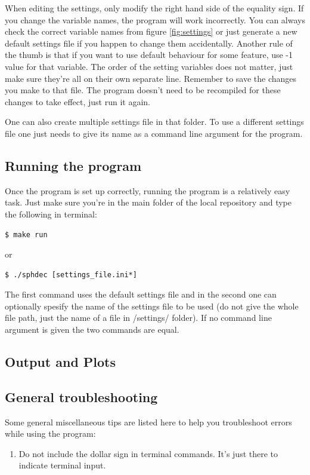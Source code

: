 \documentclass[english,12pt,a4paper,pdftex,sci,utf8]{aaltothesis}
\begin{document}
When editing the settings, only modify the right hand side of the equality sign. If you change the variable names, the program will work incorrectly. You can always check the correct variable names from figure \ref{fig:settings} or just generate a new default settings file if you happen to change them accidentally. Another rule of the thumb is that if you want to use default behaviour for some feature, use -1 value for that variable. The order of the setting variables does not matter, just make sure they're all on their own separate line. Remember to save the changes you make to that file. The program doesn't need to be recompiled for these changes to take effect, just run it again. 
\par One can also create multiple settings file in that folder. To use a different settings file one just needs to give its name as a command line argument for the program.

\subsection{Running the program}

Once the program is set up correctly, running the program is a relatively easy task. Just make sure you're in the main folder of the local repository and type the following in terminal:
\begin{verbatim}
$ make run
\end{verbatim}
or
\begin{verbatim}
$ ./sphdec [settings_file.ini*]
\end{verbatim}

\noindent The first command uses the default settings file and in the second one can optionally spesify the name of the settings file to be used (do not give the whole file path, just the name of a file in /settings/ folder). If no command line argument is given the two commands are equal.

\subsection{Output and Plots}



\subsection{General troubleshooting}
Some general miscellaneous tips are listed here to help you troubleshoot errors while using the program:
\begin{enumerate}
\item Do not include the dollar sign in terminal commands. It's just there to indicate terminal input.
\end{enumerate}
\end{document}
